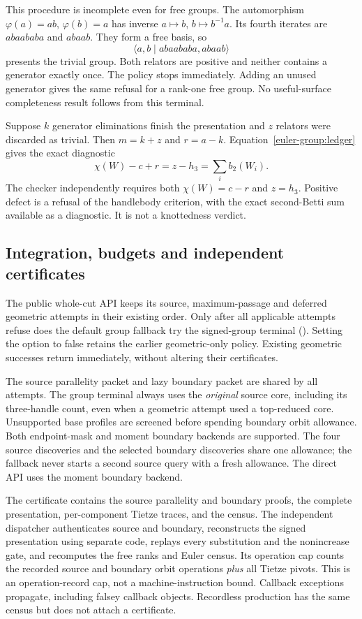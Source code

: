 This procedure is incomplete even for free groups.  The automorphism
$\varphi(a)=ab$, $\varphi(b)=a$ has inverse $a\mapsto b$,
$b\mapsto b^{-1}a$.  Its fourth iterates are $abaababa$ and $abaab$.
They form a free basis, so
\[
 \langle a,b\mid abaababa,abaab\rangle
\]
presents the trivial group.  Both relators are positive and neither
contains a generator exactly once.  The policy stops immediately.
Adding an unused generator gives the same refusal for a rank-one free
group.  No useful-surface completeness result follows from this terminal.

Suppose $k$ generator eliminations finish the presentation and $z$
relators were discarded as trivial.  Then $m=k+z$ and $r=a-k$.
Equation~\eqref{euler-group:ledger} gives the exact diagnostic
\[
 \chi(W)-c+r=z-h_3=\sum_i b_2(W_i).
\]
The checker independently requires both $\chi(W)=c-r$ and $z=h_3$.
Positive defect is a refusal of the handlebody criterion, with the exact
second-Betti sum available as a diagnostic.  It is not a knottedness
verdict.

\subsection{Integration, budgets and independent certificates}

The public whole-cut API keeps its source, maximum-passage and deferred
geometric attempts in their existing order.  Only after all applicable
attempts refuse does the default group fallback try the signed-group
terminal ().  Setting the option to false retains the earlier
geometric-only policy.  Existing geometric successes return immediately,
without altering their certificates.

The source parallelity packet and lazy boundary packet are shared by all
attempts.  The group terminal always uses the \emph{original} source
core, including its three-handle count, even when a geometric attempt
used a top-reduced core.  Unsupported base profiles are screened before
spending boundary orbit allowance.  Both endpoint-mask and moment
boundary backends are supported.  The four source discoveries and the
selected boundary discoveries share one  allowance;
the fallback never starts a second source query with a fresh allowance.
The direct  API uses the moment
boundary backend.

The  certificate contains the source
parallelity and boundary proofs, the complete presentation, per-component
Tietze traces, and the census.  The independent dispatcher authenticates
source and boundary, reconstructs the signed presentation using separate
code, replays every substitution and the nonincrease gate, and recomputes
the free ranks and Euler census.  Its operation cap counts the recorded
source and boundary orbit operations \emph{plus} all Tietze pivots.  This
is an operation-record cap, not a machine-instruction bound.  Callback
exceptions propagate, including falsey callback objects.  Recordless
production has the same census but does not attach a certificate.

